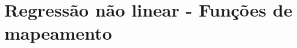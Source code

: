 

\chapter{Regressão não linear - Funções de mapeamento}



\newpage


\newpage


\newpage


\newpage


\newpage


